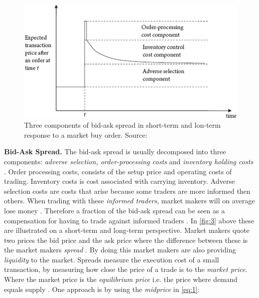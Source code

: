 \documentclass{kththesis}
\theoremstyle{definition}
\begin{document}
\begin{figure}[H]
    \centering
    \includegraphics[scale=1]{bidask.png}
    \caption{Three components of bid-ask spread in short-term and lon-term response to a market buy order. Source: \textcite{foucault2013market}}
    \label{fig:3}
\end{figure}



\textbf{Bid-Ask Spread.} The bid-ask spread is usually decomposed into three components: \textit{adverse selection, order-processing costs} and \textit{inventory holding costs} \parencite{foucault2013market}. Order processing costs, consists of the setup price and operating costs of trading. Inventory costs is cost associated with carrying inventory. Adverse selection costs are costs that arise because some traders are more informed then others. When trading with these \textit{informed traders}, market makers will on average lose money \parencite{darley2007nasdaq}. Therefore a fraction of the bid-ask spread can be seen as a compensation for having to trade against informed traders \parencite{darley2007nasdaq}. In \autoref{fig:3} above these are illustrated on a short-term and long-term perspective.
\newline
\newline
Market makers quote two prices the bid price and the ask price where the difference between these is the market makers \textit{spread} \parencite{madhavan2000market}. By doing this market makers are also providing \textit{liquidity} to the market. Spreads measure the execution cost of a small transaction, by measuring how close the price of a trade is to the \textit{market price}. Where the market price is the \textit{equilibrium price} i.e. the price where demand equals supply \parencite{cartea2015algorithmic}. One approach is by using the \textit{midprice} in \autoref{eq:1}:
\end{document}
